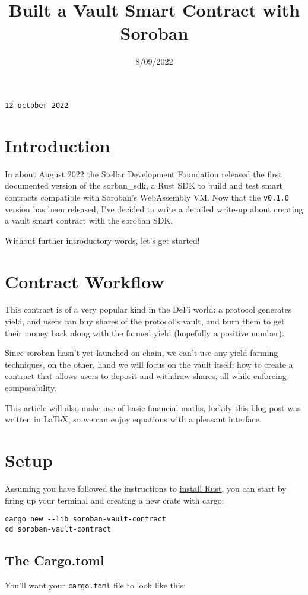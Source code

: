 \documentclass{article}
\title{Built a Vault Smart Contract with Soroban}
\date{8/09/2022}
\newcommand{\inl}[1]{\lstinline{#1}}
\begin{document}
\maketitle

\texttt{12 october 2022}

\section{Introduction}
In about August 2022 the Stellar Development Foundation released the first documented version of the sorban_sdk, a Rust SDK to build and test smart contracts compatible with Soroban’s WebAssembly VM. Now that the \inl{v0.1.0} version has been released, I’ve decided to write a detailed write-up about creating a vault smart contract with the soroban SDK.

Without further introductory words, let’s get started!

\section{Contract Workflow}
This contract is of a very popular kind in the DeFi world: a protocol generates yield, and users can buy shares of the protocol's vault, and burn them to get their money back along with the farmed yield (hopefully a positive number).

Since soroban hasn't yet launched on chain, we can't use any yield-farming techniques, on the other, hand we will focus on the vault itself: how to create a contract that allows users to deposit and withdraw shares, all while enforcing composability.

This article will also make use of basic financial maths, luckily this blog post was written in \LaTeX, so we can enjoy equations with a pleasant interface.

\section{Setup}
Assuming you have followed the instructions to \href{https://www.rust-lang.org/tools/install}{install Rust}, you can start by firing up your terminal and creating a new crate with cargo:

\begin{lstlisting}
cargo new --lib soroban-vault-contract
cd soroban-vault-contract
\end{lstlisting}


\subsection{The Cargo.toml}
You'll want your \inl{cargo.toml} file to look like this:
\end{document}
